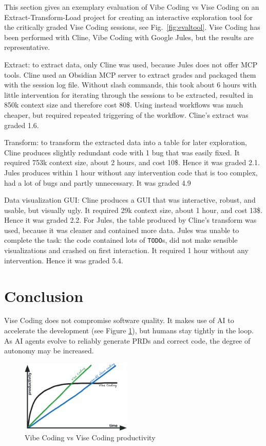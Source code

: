 \documentclass[twocolumn]{article}
\begin{document}
This section gives an exemplary evaluation of Vibe Coding vs Vise Coding on an Extract-Transform-Load project for creating an interactive exploration tool
for the critically graded Vise Coding sessions, see Fig.~\ref{fig:evaltool}. Vise Coding has been performed with Cline, Vibe Coding with Google Jules,
but the results are representative.

Extract: to extract data, only Cline was used, because Jules does not offer MCP tools. Cline used an Obsidian MCP server to extract grades
and packaged them with the session log file.
Without slash commands, this took about 6 hours with little intervention for iterating through the sessions to be extracted,
resulted in 850k context size and therefore cost 80\$. Using instead workflows was much cheaper,
but required repeated triggering of the workflow. Cline's extract was graded 1.6.

Transform: to transform the extracted data into a table for later exploration,
Cline produces slightly redundant code with 1 bug that was easily fixed.
It required 753k context size, about 2 hours, and cost 10\$. Hence it was graded 2.1.
Jules produces within 1 hour without any intervention code that is too complex, had a lot of bugs and partly unnecessary. 
It was graded 4.9

Data visualization GUI: Cline produces a GUI that was interactive, robust, and usable, but visually ugly.
It required 29k context size, about 1 hour, and cost 13\$. Hence it was graded 2.2.
For Jules, the table produced by Cline's transform was used, because it was cleaner and contained more data.
Jules was unable to complete the task: the code contained lots of \lstinline|TODO|s,
did not make sensible visualizations and crashed on first interaction.
It required 1 hour without any intervention. Hence it was graded 5.4.

\section{Conclusion}
Vise Coding does not compromise software quality.
It makes use of AI to accelerate the development (see Figure \ref{fig:vibevise}),
but humans stay tightly in the loop.
As AI agents evolve to reliably generate PRDs and correct code,
the degree of autonomy may be increased.

\begin{figure}[hbt!]
  \begin{center}
  \vspace{-2mm}
  \includegraphics[width=0.47\textwidth]{figures/vibe_vise_non_ai_v2}
  \vspace{-5mm}
\caption{Vibe Coding vs Vise Coding productivity}
\label{fig:vibevise}
\end{center}
\end{figure}



\end{document}
